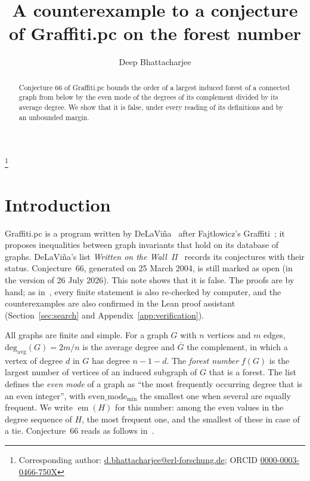 \documentclass[11pt]{amsart}
\theoremstyle{definition}
\theoremstyle{remark}
\numberwithin{equation}{section}
\newcommand{\davg}{\operatorname{deg_{avg}}}
\newcommand{\emo}{\operatorname{em}}
\newcommand{\Gb}{\overline{G}}
\begin{document}
\title[A conjecture of Graffiti.pc on the forest number]{A counterexample to a conjecture\\ of Graffiti.pc on the forest number}

\author{Deep Bhattacharjee}
\address{Formerly, Electro-Gravitational Space Propulsion Laboratory (EGSPL),\newline Bhubaneswar, Odisha 751030, India}
\thanks{Corresponding author: \href{mailto:d.bhattacharjee@erl-forschung.de}{d.bhattacharjee@erl-forschung.de}; ORCID \href{https://orcid.org/0000-0003-0466-750X}{\mbox{0000-0003-0466-750X}}}


\begin{abstract}
Conjecture 66 of Graffiti.pc bounds the order of a largest induced forest of a connected graph from below by the even mode of the degrees of its complement divided by its average degree. We show that it is false, under every reading of its definitions and by an unbounded margin.
\end{abstract}

\maketitle

\section{Introduction}

Graffiti.pc is a program written by DeLaVi\~na~\cite{DeLaVina2005} after Fajtlowicz's Graffiti~\cite{Fajtlowicz1988}; it proposes inequalities between graph invariants that hold on its database of graphs. DeLaVi\~na's list \emph{Written on the Wall~II}~\cite{WOWII} records its conjectures with their status. Conjecture~66, generated on 25 March 2004, is still marked as open (in the version of 26 July 2026). This note shows that it is false. The proofs are by hand; as in~\cite{BMB2026}, every finite statement is also re-checked by computer, and the counterexamples are also confirmed in the Lean proof assistant (Section~\ref{sec:search} and Appendix~\ref{app:verification}).

All graphs are finite and simple. For a graph $G$ with $n$ vertices and $m$ edges, $\davg(G)=2m/n$ is the average degree and $\Gb$ the complement, in which a vertex of degree $d$ in $G$ has degree $n-1-d$. The \emph{forest number} $f(G)$ is the largest number of vertices of an induced subgraph of $G$ that is a forest. The list defines the \emph{even mode} of a graph as ``the most frequently occurring degree that is an even integer'', with $\mathrm{even\_mode_{min}}$ the smallest one when several are equally frequent. We write $\emo(H)$ for this number: among the even values in the degree sequence of $H$, the most frequent one, and the smallest of these in case of a tie. Conjecture~66 reads as follows in~\cite{WOWII}.
\end{document}

